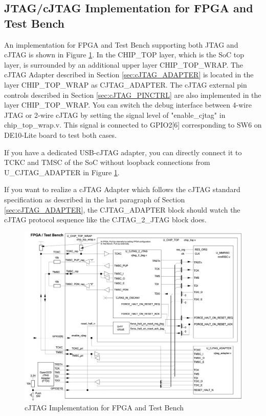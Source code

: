 \subsection{JTAG/cJTAG Implementation for FPGA and Test Bench}
\label{sec:cJTAG_FPGA}

An implementation for FPGA and Test Bench supporting both JTAG and cJTAG is shown in Figure \ref{fig:cJTAG_FPGA}. In the CHIP\_TOP layer, which is the SoC top layer, is surrounded by an additional upper layer CHIP\_TOP\_WRAP. The cJTAG Adapter described in Section \ref{sec:cJTAG_ADAPTER} is located in the layer CHIP\_TOP\_WRAP as CJTAG\_ADAPTER. The cJTAG external pin controls described in Section \ref{sec:cJTAG_PINCTRL} are also implemented in the layer CHIP\_TOP\_WRAP. You can switch the debug interface between 4-wire JTAG or 2-wire cJTAG by setting the signal level of "enable\_cjtag" in chip\_top\_wrap.v. This signal is connected to GPIO2[6] corresponding to SW6 on DE10-Lite board to test both cases.\

If you have a dedicated USB-cJTAG adapter, you can directly connect it to TCKC and TMSC of the SoC without loopback connections from U\_CJTAG\_ADAPTER in Figure \ref{fig:cJTAG_FPGA}.\

If you want to realize a cJTAG Adapter which follows the cJTAG standard specification as described in the last paragraph of Section \ref{sec:cJTAG_ADAPTER}, the CJTAG\_ADAPTER block should watch the cJTAG protocol sequence like the CJTAG\_2\_JTAG block does.

\begin{figure}[H]
    \includegraphics[width=0.90\columnwidth]{./Figure/cJTAG_FPGA.png}
    \caption{cJTAG Implementation for FPGA and Test Bench}
    \label{fig:cJTAG_FPGA}
\end{figure}






